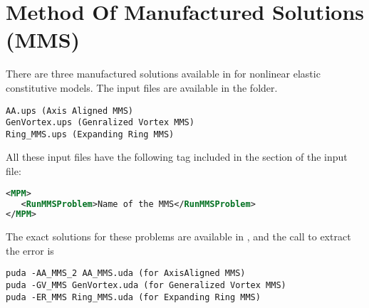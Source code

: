 \newpage
\section{Method Of Manufactured Solutions (MMS)}
There are three manufactured solutions available in \Vaango for nonlinear elastic constitutive models. The input files are available in the  folder. 
\begin{lstlisting}[backgroundcolor=\color{background}]
AA.ups (Axis Aligned MMS)
GenVortex.ups (Genralized Vortex MMS)
Ring_MMS.ups (Expanding Ring MMS)
\end{lstlisting}
All these input files have the following tag included in the  section of the input file:
\begin{lstlisting}[language=XML]
<MPM>
   <RunMMSProblem>Name of the MMS</RunMMSProblem>  
</MPM>
\end{lstlisting}
The exact solutions for these problems are available in , and the call to extract the error is
\begin{lstlisting}[backgroundcolor=\color{background}]
puda -AA_MMS_2 AA_MMS.uda (for AxisAligned MMS)
puda -GV_MMS GenVortex.uda (for Generalized Vortex MMS)
puda -ER_MMS Ring_MMS.uda (for Expanding Ring MMS)
\end{lstlisting}

